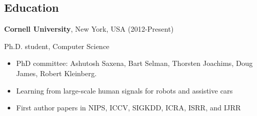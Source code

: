 \documentclass[line,margin]{res}
\begin{document}
 

\address{350 Gates Hall, Cornell University, NY 14850}
\address{ashesh@cs.cornell.edu, \url{www.cs.cornell.edu/~ashesh}}



\begin{resume} 
 
\iffalse
\section{Interests}
My research interest lies at the intersection of computer vision, machine learning, and robotics. Broadly, I build machine learning systems \& algorithms for agents -- such as robots, cars etc. -- to learn from informative human signals at a large-scale. Most of my work has been in multi-modal sensor-rich robotic settings, for which I have developed sensory fusion deep learning architectures. I have developed and deployed algorithms on multiple robotic platforms (PR2, Baxter etc.), on cars, and crowd-sourcing systems.
\fi 
 
\iffalse

for humans to help machines -- such as robots, cars etc. -- become smart by implicitly providing
learning signals. I am particularly interested in learning from signals that are easy to
elicit at large-scale but are inherently weak and noisy. I am recently
exploiting the potential of crowd-sourcing feedback to teach robots good trajectories in
context-rich environments and using vision based human feedback for
assistive cars. 
\fi
\section{Education} 
 
{\bf Cornell University}, New York, USA  \hfill (2012-Present)
 
 \vspace{-4mm}
  \hspace {4mm } Ph.D. student, Computer Science 
 \begin{itemize} \itemsep -2pt  %
 \item PhD committee: Ashutosh Saxena, Bart Selman, Thorsten Joachims, Doug James,
Robert Kleinberg.
 \item Learning from large-scale human signals for robots and assistive cars
  \item First author papers in NIPS, ICCV, SIGKDD, ICRA, ISRR, and IJRR
 \end{itemize}
 


\end{resume}
\end{document}
